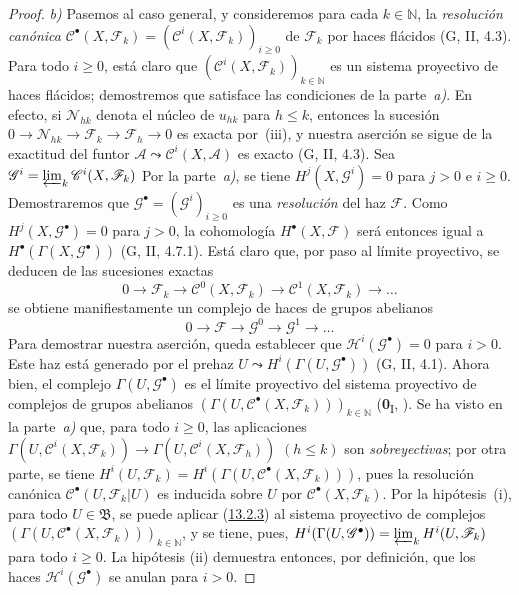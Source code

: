 \begin{proof}
\emph{b)} Pasemos al caso general, y consideremos para cada $k\in\mathbb N$, la \emph{resolución canónica} $\mathcal C^\bullet(X,\mathcal F_k)
=(\mathcal C^i(X,\mathcal F_k))_{i\geq0}$
de $\mathcal F_k$ por haces flácidos (G, II, 4.3).
Para todo $i\geq0$, está claro que
$(\mathcal C^i(X,\mathcal F_k))_{k\in\mathbb N}$ es un sistema proyectivo de
haces flácidos; demostremos que satisface las condiciones de la
parte~\emph{a)}.
En efecto, si $\mathcal N_{hk}$ denota el núcleo de $u_{hk}$ para $h\leq k$,
entonces la sucesión
$0\to\mathcal N_{hk}\to\mathcal F_k\to\mathcal F_h\to0$
es exacta por~{\rm(iii)}, y nuestra aserción se sigue de la exactitud
del funtor
$\mathcal A\leadsto\mathcal C^i(X,\mathcal A)$ es exacto (G, II, 4.3). Sea $\mathcal G^i=\varprojlim_k\mathcal C^i(X,\mathcal F_k)$
Por la parte~\emph{a)}, se tiene
$H^j(X,\mathcal G^i)=0$ para $j>0$ e $i\geq0$.
Demostraremos que
$\mathcal G^\bullet=(\mathcal G^i)_{i\geq0}$ es una \emph{resolución} del haz
$\mathcal F$. Como $H^j(X,\mathcal G^\bullet)=0$ para $j>0$, la cohomología
$H^\bullet(X,\mathcal F)$ será entonces igual a
$H^\bullet(\Gamma(X,\mathcal G^\bullet))$ (G, II, 4.7.1). Está claro que, por paso al límite proyectivo, se deducen de las sucesiones exactas \[
0\longrightarrow\mathcal F_k
\longrightarrow\mathcal C^0(X,\mathcal F_k)
\longrightarrow\mathcal C^1(X,\mathcal F_k)\longrightarrow\ldots
\]
se obtiene manifiestamente un complejo de haces de grupos abelianos
\[
0\longrightarrow\mathcal F\longrightarrow\mathcal G^0
\longrightarrow\mathcal G^1\longrightarrow\ldots
\]
Para demostrar nuestra aserción, queda establecer que
$\mathcal H^i(\mathcal G^\bullet)=0$ para $i>0$.
Este haz está generado por el prehaz
$U\leadsto H^i(\Gamma(U,\mathcal G^\bullet))$
(G, II, 4.1).
Ahora bien, el complejo $\Gamma(U,\mathcal G^\bullet)$ es el límite proyectivo
del sistema proyectivo de complejos de grupos abelianos
$(\Gamma(U,\mathcal C^\bullet(X,\mathcal F_k)))_{k\in\mathbb N}$
(\textbf{0}\textsubscript{I}, ).
Se ha visto en la parte~\emph{a)} que, para todo $i\geq0$, las aplicaciones $\Gamma(U,\mathcal C^i(X,\mathcal F_k))\to
\Gamma(U,\mathcal C^i(X,\mathcal F_h))$ $(h\leq k)$ son \emph{sobreyectivas}; por otra parte, se tiene
$H^i(U,\mathcal F_k)=
H^i(\Gamma(U,\mathcal C^\bullet(X,\mathcal F_k)))$,
pues la resolución canónica $\mathcal C^\bullet(U,\mathcal F_k|U)$ es
inducida sobre $U$ por $\mathcal C^\bullet(X,\mathcal F_k)$.
Por la hipótesis~{\rm(i)}, para todo $U\in\mathfrak B$, se puede aplicar (\hyperref[0.13.2.3-fr]{13.2.3}) al sistema proyectivo de complejos $(\Gamma(U,\mathcal C^\bullet(X,\mathcal F_k)))_{k\in\mathbb N}$, y se tiene, pues, $H^i(\Gamma(U,\mathcal G^\bullet))=\varprojlim_k H^i(U,\mathcal F_k)$ para todo $i\geq0$. La hipótesis (ii) demuestra entonces, por definición, que los haces $\mathcal H^i(\mathcal G^\bullet)$ se anulan para $i>0$.


\end{proof}
